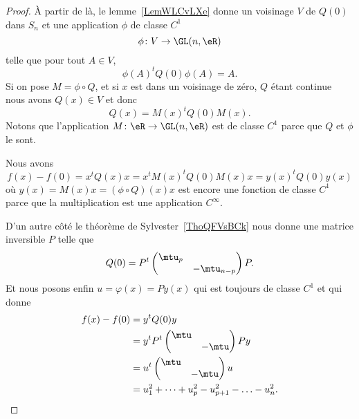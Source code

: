 \begin{proof}
	À partir de là, le lemme~\ref{LemWLCvLXe} donne un voisinage \( V\) de \( Q(0)\) dans \( S_n\) et une application \( \phi\) de classe \( C^1\)
	\begin{equation}
		\phi\colon V\to \GL(n,\eR) \\
	\end{equation}
	telle que pour tout \( A\in V\),
	\begin{equation}
		\phi(A)^tQ(0)\phi(A)=A.
	\end{equation}
	Si on pose \( M=\phi\circ Q\), et si \( x\) est dans un voisinage de zéro, \( Q\) étant continue nous avons \( Q(x)\in V\) et donc
	\begin{equation}
		Q(x)=M(x)^tQ(0)M(x).
	\end{equation}
	Notons que l'application \( M\colon \eR\to \GL(n,\eR)\) est de classe \( C^1\) parce que \( Q\) et \( \phi\) le sont.

	Nous avons
	\begin{equation}
		f(x)-f(0)=x^tQ(x)x=x^tM(x)^tQ(0)M(x)x=y(x)^tQ(0)y(x)
	\end{equation}
	où \( y(x)=M(x)x=(\phi\circ Q)(x)x\) est encore une fonction de classe \( C^1\) parce que la multiplication est une application \(  C^{\infty}\).

	D'un autre côté le théorème de Sylvester~\ref{ThoQFVsBCk} nous donne une matrice inversible \( P\) telle que
	\begin{equation}
		Q(0)=P^t\begin{pmatrix}
			\mtu_p &             \\
			       & -\mtu_{n-p}
		\end{pmatrix}P.
	\end{equation}
	Et nous posons enfin \( u=\varphi(x)=Py(x)\) qui est toujours de classe \( C^1\) et qui donne
	\begin{subequations}
		\begin{align}
			f(x)-f(0) & =y^tQ(0)y                                     \\
			          & =y^tP^t\begin{pmatrix}
				                   \mtu &       \\
				                        & -\mtu
			                   \end{pmatrix}Py                        \\
			          & =u^t\begin{pmatrix}
				                \mtu &       \\
				                     & -\mtu
			                \end{pmatrix}u                            \\
			          & =u_1^2+\cdots +u_p^2-u_{p+1}^2-\ldots -u_n^2.
		\end{align}
	\end{subequations}


\end{proof}
